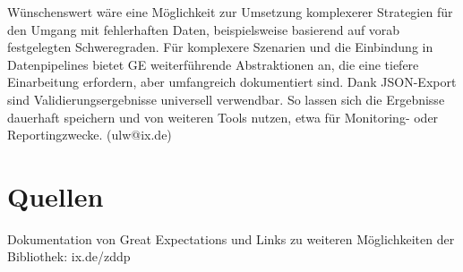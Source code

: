 	Wünschenswert wäre eine Möglichkeit zur Umsetzung komplexerer Strategien für den Umgang mit fehlerhaften Daten, beispielsweise basierend auf vorab festgelegten Schweregraden. Für komplexere Szenarien und die Einbindung in Datenpipelines bietet GE weiterführende Abstraktionen an, die eine tiefere Einarbeitung erfordern, aber umfangreich dokumentiert sind. Dank JSON-Export sind Validierungsergebnisse universell verwendbar. So lassen sich die Ergebnisse dauerhaft speichern und von weiteren Tools nutzen, etwa für Monitoring- oder Reportingzwecke. (ulw@ix.de)
	
\section{Quellen}

Dokumentation von Great Expectations und Links zu weiteren Möglichkeiten der Bibliothek: ix.de/zddp
	
	
